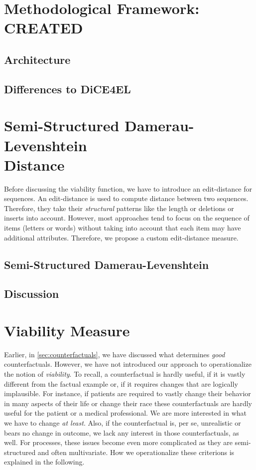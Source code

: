 \documentclass[12pt,a4paper]{report}
\begin{document}
\section{Methodological Framework: CREATED}
\label{sec:framework}
\subsection{Architecture}


\subsection{Differences to DiCE4EL}


\section{Semi-Structured Damerau-Levenshtein \\ Distance}
\label{sec:ssdld}
Before discussing the viability function, we have to introduce an edit-distance for sequences. An edit-distance is used to compute distance between two sequences. Therefore, they take their \emph{structural} patterns like the length or deletions or inserts into account. However, most approaches tend to focus on the sequence of items (letters or words) without taking into account that each item may have additional attributes. Therefore, we propose a custom edit-distance measure. 

\subsection{Semi-Structured Damerau-Levenshtein}


\subsection{Discussion}


\section{Viability Measure}
\label{sec:viability}
Earlier, in \autoref{sec:counterfactuals}, we have discussed what determines \emph{good} counterfactuals. However, we have not introduced our approach to operationalize the notion of \emph{viability}. To recall, a counterfactual is hardly useful, if it is vastly different from the factual example or, if it requires changes that are logically implausible. For instance, if patients are required to vastly change their behavior in many aspects of their life or change their race these counterfactuals are hardly useful for the patient or a medical professional. We are more interested in what we have to change \emph{at least}. Also, if the counterfactual is, per se, unrealistic or bears no change in outcome, we lack any interest in those counterfactuals, as well. For processes, these issues become even more complicated as they are semi-structured and often multivariate. How we operationalize these criterions is explained in the following.
\end{document}

